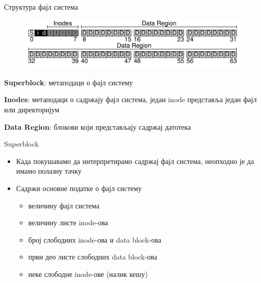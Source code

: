 \documentclass[xcolor=table]{beamer}
\begin{document}
    \begin{frame}{Структура фајл система}
        \begin{figure}
            \includegraphics[width=\textwidth,height=0.8\textheight,keepaspectratio]{images/fs_structure.png}
            \label{fig:fs_structure.png}
        \end{figure}
        
        \textbf{Superblock}: метаподаци о фајл систему
        
        \textbf{Inodes}: метаподаци о садржају фајл система, један inode представља један фајл или директоријум
        
        \textbf{Data Region}: блокови који представљају садржај датотека
    \end{frame}
    
    \begin{frame}{Superblock}
        \begin{itemize}
            \item Када покушавамо да интерпретирамо садржај фајл система, неопходно је да имамо полазну тачку
            \item Садржи основне податке о фајл систему
            \begin{itemize}
                \item величину фајл система
                \item величину листе inode-ова
                \item број слободних inode-ова и data block-ова
                \item први део листе слободних data block-ова
                \item неке слободне inode-ове (налик кешу)
            \end{itemize}
        \end{itemize}
    \end{frame}
    
\end{document}
